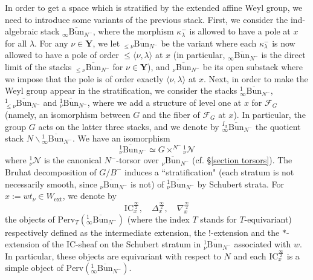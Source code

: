 \documentclass[11pt]{amsart}
\theoremstyle{plain}
\theoremstyle{remark}
\numberwithin{equation}{section}
\begin{document}
 In order to get a space which is stratified by the extended affine Weyl group, we need to introduce some variants of the previous stack. First, we consider the ind-algebraic stack $_\infty\overline{\mathrm{Bun}}_{N^-}$, where the morphism $\kappa^-_\lambda$ is allowed to have a pole at $x$ for all $\lambda$. For any $\nu\in\mathbf{Y}$, we let $_{\leq \nu}\overline{\mathrm{Bun}}_{N^-}$ be the variant where  each $\kappa^-_\lambda$ is now allowed to have a pole of order $\leq\langle\nu,\lambda\rangle$ at $x$ (in particular,  $_\infty\overline{\mathrm{Bun}}_{N^-}$ is the direct limit of the stacks $_{\leq \nu}\overline{\mathrm{Bun}}_{N^-}$ for $\nu\in\mathbf{Y}$), and $_{\nu}\overline{\mathrm{Bun}}_{N^-}$ be its open substack where we impose that the pole is of order exactly $\langle\nu,\lambda\rangle$ at $x$. Next, in order to make the Weyl group appear in the stratification, we consider the stacks $^1_\infty\overline{\mathrm{Bun}}_{N^-}$, $^1_{\leq\nu}\overline{\mathrm{Bun}}_{N^-}$ and $^1_{\nu}\overline{\mathrm{Bun}}_{N^-}$, where we add a structure of level one at $x$ for $\mathcal{F}_G$ (namely, an isomorphism between $G$ and the fiber of $\mathcal{F}_G$ at $x$). In particular, the group $G$ acts on the latter three stacks, and we denote by $^{I_\mathrm{u}}_\infty\overline{\mathrm{Bun}}_{N^-}$ the quotient stack $N\backslash{^{1}_\infty\overline{\mathrm{Bun}}_{N^-}}$. We have an isomorphism
 $$^1_\nu\overline{\mathrm{Bun}}_{N^-}\simeq G\times^{N^-}{^1_\nu\mathcal{N}}$$
 where $^1_\nu\mathcal{N}$ is the canonical $N^-$-torsor over $_\nu\overline{\mathrm{Bun}}_{N^-}$ (cf. §\ref{section torsors}). The Bruhat decomposition of $G/B^{-}$ induces a ``stratification" (each stratum is not necessarily smooth, since $_\nu\overline{\mathrm{Bun}}_{N^-}$ is not) of $^1_\nu\overline{\mathrm{Bun}}_{N^-}$ by Schubert strata. For $x:=wt_\nu\in W_\mathrm{ext}$, we denote by 
 $$\mathrm{IC}_x^{\frac{\infty}{2}},\quad\Delta_x^{\frac{\infty}{2}},\quad \nabla_x^{\frac{\infty}{2}} $$ the objects of $\mathrm{Perv}_T(^1_\infty\overline{\mathrm{Bun}}_{N^-})$ (where the index $T$ stands for $T$-equivariant) respectively defined as the intermediate extension, the $!$-extension and the $*$-extension of the IC-sheaf on the Schubert stratum in $^1_\nu\overline{\mathrm{Bun}}_{N^-}$ associated with $w$. In particular, these objects are equivariant with respect to $N$ and each $\mathrm{IC}_x^{\frac{\infty}{2}}$ is a simple object of $\mathrm{Perv}(^1_\infty\overline{\mathrm{Bun}}_{N^-})$.
\end{document}
